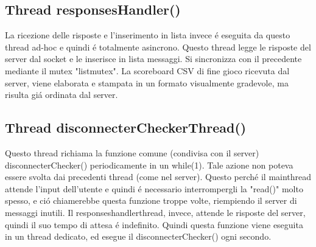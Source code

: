  \subsection{Thread responsesHandler()}
 La ricezione delle risposte e l'inserimento in lista invece \'e eseguita da questo thread ad-hoc e quindi \'e totalmente asincrono. Questo thread legge le risposte del server dal socket e le inserisce in lista messaggi. Si sincronizza con il precedente mediante il mutex "listmutex". La scoreboard CSV di fine gioco ricevuta dal server, viene elaborata e stampata in un formato visualmente gradevole, ma risulta gi\'a ordinata dal server.

 \subsection{Thread disconnecterCheckerThread()}
 Questo thread richiama la funzione comune (condivisa con il server) disconnecterChecker() periodicamente in un while(1). Tale azione non poteva essere svolta dai precedenti thread (come nel server). Questo perch\'e il mainthread attende l'input dell'utente e quindi \'e necessario interrompergli la "read()" molto spesso, e ci\'o chiamerebbe questa funzione troppe volte, riempiendo il server di messaggi inutili. Il responseshandlerthread, invece, attende le risposte del server, quindi il suo tempo di attesa \'e indefinito. Quindi questa funzione viene eseguita in un thread dedicato, ed esegue il disconnecterChecker() ogni secondo.

















